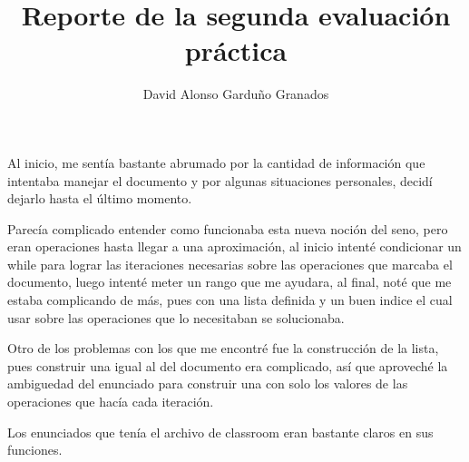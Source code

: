 \documentclass[french]{article}
\title{Reporte de la segunda evaluación práctica}
\author{David Alonso Garduño Granados}
\begin{document}
	\maketitle
	
Al inicio, me sentía bastante abrumado por la cantidad de información que intentaba manejar el documento y por algunas situaciones personales, decidí dejarlo hasta el último momento.

Parecía complicado entender como funcionaba esta nueva noción del seno, pero eran operaciones hasta llegar a una aproximación, al inicio intenté condicionar un while para lograr las iteraciones necesarias sobre las operaciones que marcaba el documento, luego intenté meter un rango que me ayudara, al final, noté que me estaba complicando de más, pues con una lista definida y un buen indice el cual usar sobre las operaciones que lo necesitaban se solucionaba.

Otro de los problemas con los que me encontré fue la construcción de la lista, pues construir una igual al del documento era complicado, así que aproveché la ambiguedad del enunciado para construir una con solo los valores de las operaciones que hacía cada iteración.

Los enunciados que tenía el archivo de classroom eran bastante claros en sus funciones.
\end{document}
